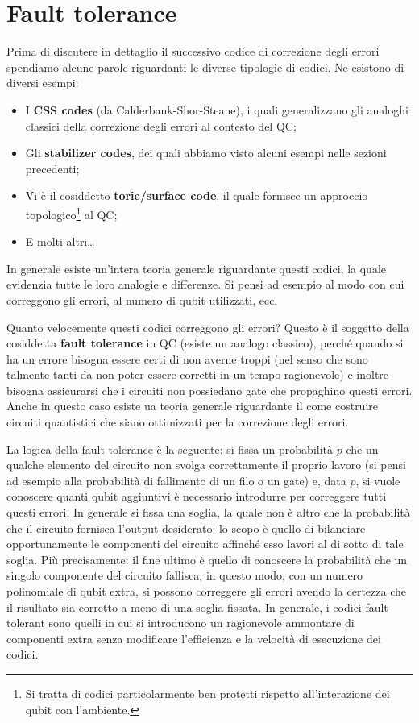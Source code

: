 \newpage 

\noindent {}
\vspace{0.5cm}

\section{Fault tolerance}
Prima di discutere in dettaglio il successivo codice di correzione degli errori spendiamo alcune parole riguardanti le diverse tipologie di codici. Ne esistono di diversi esempi:
\begin{itemize}
    \item I \textbf{CSS codes} (da Calderbank-Shor-Steane), i quali generalizzano gli analoghi classici della correzione degli errori al contesto del QC;
    \item Gli \textbf{stabilizer codes}, dei quali abbiamo visto alcuni esempi nelle sezioni precedenti;
    \item Vi è il cosiddetto \textbf{toric/surface code}, il quale fornisce un approccio topologico\footnote{Si tratta di codici particolarmente ben protetti rispetto all'interazione dei qubit con l'ambiente.} al QC;
    \item E molti altri\dots
\end{itemize}
In generale esiste un'intera teoria generale riguardante questi codici, la quale evidenzia tutte le loro analogie e differenze. Si pensi ad esempio al modo con cui correggono gli errori, al numero di qubit utilizzati, ecc.

\noindent Quanto velocemente questi codici correggono gli errori? Questo è il soggetto della cosiddetta \textbf{fault tolerance} in QC (esiste un analogo classico), perché quando si ha un errore bisogna essere certi di non averne troppi (nel senso che sono talmente tanti da non poter essere corretti in un tempo ragionevole) e inoltre bisogna assicurarsi che i circuiti non possiedano gate che propaghino questi errori. Anche in questo caso esiste ua teoria generale riguardante il come costruire circuiti quantistici che siano ottimizzati per la correzione degli errori. 

\noindent La logica della fault tolerance è la seguente: si fissa un probabilità $p$ che un qualche elemento del circuito non svolga correttamente il proprio lavoro (si pensi ad esempio alla probabilità di fallimento di un filo o un gate) e, data $p$, si vuole conoscere quanti qubit aggiuntivi è necessario introdurre per correggere tutti questi errori. In generale si fissa una soglia, la quale non è altro che la probabilità che il circuito fornisca l'output desiderato: lo scopo è quello di bilanciare opportunamente le componenti del circuito affinché esso lavori al di sotto di tale soglia. Più precisamente: il fine ultimo è quello di conoscere la probabilità che un singolo componente del circuito fallisca; in questo modo, con un numero polinomiale di qubit extra, si possono correggere gli errori avendo la certezza che il risultato sia corretto a meno di una soglia fissata. In generale, i codici fault tolerant sono quelli in cui si introducono un ragionevole ammontare di componenti extra senza modificare l'efficienza e la velocità di esecuzione dei codici. 

